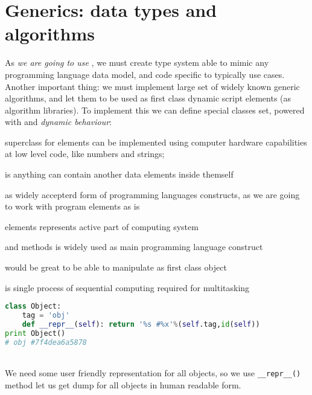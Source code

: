 \chapter{Generics: data types and algorithms}\clearpage

As \emph{we are going to use }, we must create type
system able to mimic any programming language data model, and 
code specific to typically use cases. Another important thing: we must implement
large set of widely known generic algorithms, and let them to be used as
first class dynamic script elements (as algorithm libraries).
To implement this we can define special classes set, powered with
 and \emph{dynamic behaviour}:
\begin{description}[nosep]
\item[Primitive] superclass for elements can be implemented using
computer hardware capabilities at low level code, like numbers and strings;
\item[Collection] is anything can contain another data elements inside themself
\item[AST] as widely accepterd form of programming languages constructs, as
we are going to work with program elements as is
\item[Active] elements represents active part of computing system
\item[Function] and methods is widely used as main programming language
construct
\item[Algorithm] would be great to be able to manipulate as first class object
\item[Thread] is single process of sequential computing required for
multitasking
\end{description}



\begin{lstlisting}[language=Python]
class Object:
    tag = 'obj'
    def __repr__(self): return '%s #%x'%(self.tag,id(self))
print Object()
# obj #7f4dea6a5878
\end{lstlisting}
\\We need some user friendly representation for all objects, so we use
\verb|__repr__()| method let us get dump for all objects in human readable form.


